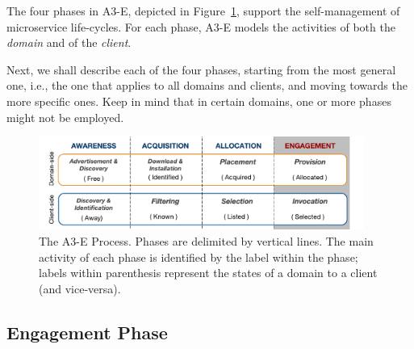
The four phases in A3-E, depicted in Figure~\ref{fig:A3-E-process}, support the self-management of microservice life-cycles. For each phase, A3-E  models the activities of both the \textit{domain} and of the \textit{client}. 

Next, we shall describe each of the four phases, starting from the most general one, i.e., the one that applies to all domains and clients, and moving towards the more specific ones. Keep in mind that in certain domains, one or more phases might not be employed.


\begin{figure}[tbp]
	\includegraphics[width=0.95\textwidth]{figs/A3-E-process}
	\caption{The A3-E Process. Phases are delimited by vertical lines. The main activity of each phase is identified by the label within the phase; labels within parenthesis represent the states of a domain to a client (and vice-versa).}
	\label{fig:A3-E-process}
\end{figure}



\subsection*{Engagement Phase}\label{sec:A3-E-engagement}

